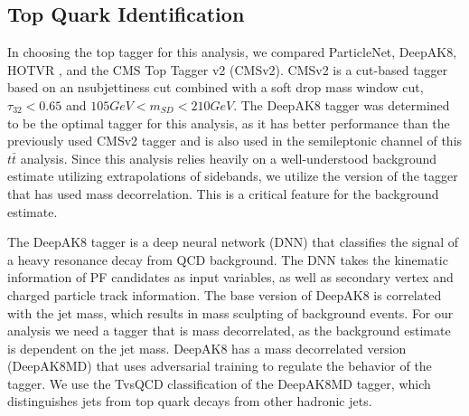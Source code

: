 \subsection{Top Quark Identification}


In choosing the top tagger for this analysis, we compared ParticleNet, DeepAK8, HOTVR \cite{HOTVR}, and the CMS Top Tagger v2 (CMSv2). CMSv2 is a cut-based tagger based on an nsubjettiness cut combined with a soft drop mass window cut, $\tau_{32} < 0.65$ and $105 GeV < m_{SD} < 210 GeV$. The DeepAK8 tagger was determined to be the optimal tagger for this analysis, as it has better performance than the previously used CMSv2 tagger and is also used in the semileptonic channel of this $t\bar{t}$ analysis. Since this analysis relies heavily on a well-understood background estimate utilizing extrapolations of sidebands, we utilize the version of the tagger that has used mass decorrelation. This is a critical feature for the background estimate. 

The DeepAK8 tagger is a deep neural network (DNN) that classifies the signal of a heavy resonance decay from QCD background. The DNN takes the kinematic information of PF candidates as input variables, as well as secondary vertex and charged particle track information. The base version of DeepAK8 is correlated with the jet mass, which results in mass sculpting of background events. For our analysis we need a tagger that is mass decorrelated, as the background estimate is dependent on the jet mass. DeepAK8 has a mass decorrelated version (DeepAK8MD) that uses adversarial training to regulate the behavior of the tagger. We use the TvsQCD classification of the DeepAK8MD tagger, which distinguishes jets from top quark decays from other hadronic jets.  





